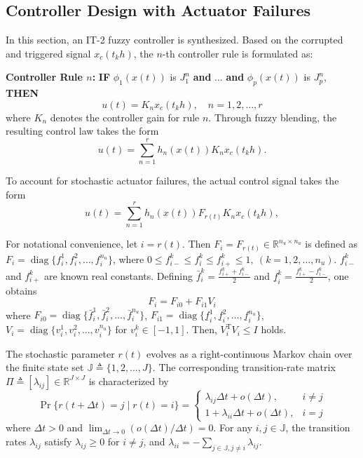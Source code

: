\documentclass[preprint,review,fleqn,sort&compress,3p]{elsarticle}
\theoremstyle{definition} %
\theoremstyle{definition}%
\begin{document}
\subsection{Controller Design with Actuator Failures}
In this section, an IT-2 fuzzy controller is synthesized. Based on the corrupted and triggered signal $x_c(t_k h)$, the $n$-th controller rule is formulated as:

\textbf{Controller Rule $n$:} 
\textbf{IF} $\phi_1(x(t))$ is $J^{n}_1$ \textbf{and} $\dots$ \textbf{and} $\phi_p(x(t))$ is $J^{n}_p$, \textbf{THEN}
\begin{equation} 
	u(t) = K_{n} x_c(t_{k} h), \quad n = 1, 2, \ldots, r
\end{equation}
where $K_n$ denotes the controller gain for rule $n$. Through fuzzy blending, the resulting control law takes the form
\begin{equation} 
	u(t) = \sum_{n=1}^{r} h_n(x(t)) K_{n} x_c(t_k h).
\end{equation}

To account for stochastic actuator failures, the actual control signal takes the form
\begin{equation}\label{eq:local_controller}
	u(t) = \sum_{n=1}^{r} h_n(x(t)) F_{r(t)} K_{n} x_c(t_k h),
\end{equation}

For notational convenience, let $i = r(t)$. 
Then $F_i = F_{r(t)} \in \mathbb{R}^{n_u \times n_u}$ is defined as $F_i = \operatorname{diag}\{f_{i}^1, f_{i}^2, \ldots, f_{i}^{n_u}\}$, where $0 \le f_{i-}^{k} \le f_{i}^{k} \le f_{i+}^{k} \le 1,\ (k = 1,2,\ldots,n_u)$. $f_{i-}^{k}$ and $f_{i+}^{k}$ are known real constants. 
Defining $\bar{f}_{i}^{k} = \frac{f_{i+}^{k} + f_{i-}^{k}}{2}$ and $\underline{f}_{i}^{k} = \frac{f_{i+}^{k} - f_{i-}^{k}}{2}$, one obtains
\begin{equation}\label{F_i01}
	F_{i}= F_{i0}+F_{i1} V_{i}
\end{equation}
where $F_{i0} = \operatorname{diag}\{\bar{f}_{i}^{1}, \bar{f}_{i}^{2}, \ldots, \bar{f}_{i}^{n_u}\}$, $F_{i1} = \operatorname{diag}\{\underline{f}_{i}^{1}, \underline{f}_{i}^{2}, \ldots, \underline{f}_{i}^{n_u}\}$, $V_i = \operatorname{diag}\{v_{i}^{1}, v_{i}^{2}, \ldots, v_{i}^{n_u}\}$ for $v_i^k \in [-1,1]$. Then, $V_i^\mathrm{T}V_i \le I$ holds.

The stochastic parameter $r(t)$ evolves as a right-continuous Markov chain over the finite state set $\mathbb{J} \triangleq \{1,2,\dots,J\}$. The corresponding transition-rate matrix $\Pi \triangleq [\lambda_{ij}] \in \mathbb{R}^{J \times J}$ is characterized by
\begin{equation} \label{eq:markov_jump}
	\Pr\{r(t+\Delta t) = j \mid r(t) = i\}
	=
	\begin{cases}
		\lambda_{ij}\Delta t + o(\Delta t), & i \neq j \\
		1 + \lambda_{ii}\Delta t + o(\Delta t), & i = j
	\end{cases}
\end{equation}
where $\Delta t > 0$ and $\lim_{\Delta t \to 0} (o(\Delta t) / \Delta t) = 0$. For any $i, j \in \mathbb{J}$, the transition rates $\lambda_{ij}$ satisfy $\lambda_{ij} \ge 0$ for $i \neq j$, and $\lambda_{ii} = -\sum_{j \in \mathbb{J}, j \neq i} \lambda_{ij}$.
\end{document}

